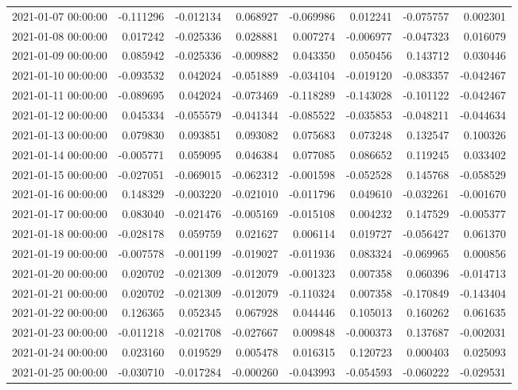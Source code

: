 \begin{tabular}{lrrrrrrr}
2021-01-07 00:00:00 & -0.111296 & -0.012134 & 0.068927 & -0.069986 & 0.012241 & -0.075757 & 0.002301 \\
2021-01-08 00:00:00 & 0.017242 & -0.025336 & 0.028881 & 0.007274 & -0.006977 & -0.047323 & 0.016079 \\
2021-01-09 00:00:00 & 0.085942 & -0.025336 & -0.009882 & 0.043350 & 0.050456 & 0.143712 & 0.030446 \\
2021-01-10 00:00:00 & -0.093532 & 0.042024 & -0.051889 & -0.034104 & -0.019120 & -0.083357 & -0.042467 \\
2021-01-11 00:00:00 & -0.089695 & 0.042024 & -0.073469 & -0.118289 & -0.143028 & -0.101122 & -0.042467 \\
2021-01-12 00:00:00 & 0.045334 & -0.055579 & -0.041344 & -0.085522 & -0.035853 & -0.048211 & -0.044634 \\
2021-01-13 00:00:00 & 0.079830 & 0.093851 & 0.093082 & 0.075683 & 0.073248 & 0.132547 & 0.100326 \\
2021-01-14 00:00:00 & -0.005771 & 0.059095 & 0.046384 & 0.077085 & 0.086652 & 0.119245 & 0.033402 \\
2021-01-15 00:00:00 & -0.027051 & -0.069015 & -0.062312 & -0.001598 & -0.052528 & 0.145768 & -0.058529 \\
2021-01-16 00:00:00 & 0.148329 & -0.003220 & -0.021010 & -0.011796 & 0.049610 & -0.032261 & -0.001670 \\
2021-01-17 00:00:00 & 0.083040 & -0.021476 & -0.005169 & -0.015108 & 0.004232 & 0.147529 & -0.005377 \\
2021-01-18 00:00:00 & -0.028178 & 0.059759 & 0.021627 & 0.006114 & 0.019727 & -0.056427 & 0.061370 \\
2021-01-19 00:00:00 & -0.007578 & -0.001199 & -0.019027 & -0.011936 & 0.083324 & -0.069965 & 0.000856 \\
2021-01-20 00:00:00 & 0.020702 & -0.021309 & -0.012079 & -0.001323 & 0.007358 & 0.060396 & -0.014713 \\
2021-01-21 00:00:00 & 0.020702 & -0.021309 & -0.012079 & -0.110324 & 0.007358 & -0.170849 & -0.143404 \\
2021-01-22 00:00:00 & 0.126365 & 0.052345 & 0.067928 & 0.044446 & 0.105013 & 0.160262 & 0.061635 \\
2021-01-23 00:00:00 & -0.011218 & -0.021708 & -0.027667 & 0.009848 & -0.000373 & 0.137687 & -0.002031 \\
2021-01-24 00:00:00 & 0.023160 & 0.019529 & 0.005478 & 0.016315 & 0.120723 & 0.000403 & 0.025093 \\
2021-01-25 00:00:00 & -0.030710 & -0.017284 & -0.000260 & -0.043993 & -0.054593 & -0.060222 & -0.029531 \\

\end{tabular}
